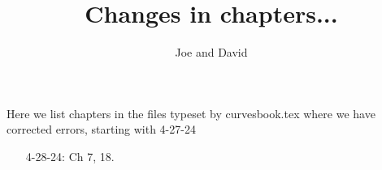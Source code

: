 \documentclass[11pt]{amsart}
\title{Changes in chapters...}
\author{Joe and David}
\begin{document}
\maketitle



  Here we list chapters in the files typeset by curvesbook.tex where we have corrected errors, starting with 4-27-24
 
\begin{enumerate}
 \item[4-28-24:] Ch 7, 18.

\end{enumerate}
\end{document}
